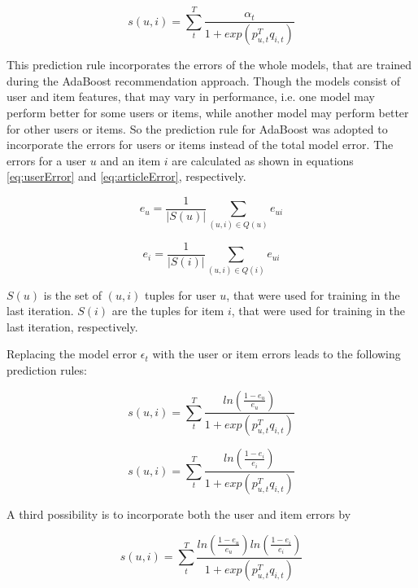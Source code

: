 \documentclass[10pt]{reportMaster}
\begin{document}
\begin{equation}
\label{eq:adaBoostPredRule}
s(u,i) = \sum_t^T{\frac{\alpha_t}{1 + exp(p_{u,t}^Tq_{i,t})}}
\end{equation}

This prediction rule incorporates the errors of the whole models, that are trained during the AdaBoost recommendation approach.
Though the models consist of user and item features, that may vary in performance, i.e. one model may perform better for some users or items, while another model may perform better for other users or items.
So the prediction rule for AdaBoost was adopted to incorporate the errors for users or items instead of the total model error.
The errors for a user $u$ and an item $i$ are calculated as shown in equations \ref{eq:userError} and \ref{eq:articleError}, respectively.

\begin{equation}
	\label{eq:userError}
	e_{u} = \frac{1}{|S(u)|} \sum_{(u,i) \in Q(u)}{e_{ui}}
\end{equation}

\begin{equation}
	\label{eq:articleError}
	e_{i} = \frac{1}{|S(i)|} \sum_{(u,i) \in Q(i)}{e_{ui}}
\end{equation}

$S(u)$ is the set of $(u,i)$ tuples for user $u$, that were used for training in the last iteration.
$S(i)$ are the tuples for item $i$, that were used for training in the last iteration, respectively.

Replacing the model error $\epsilon_t$ with the user or item errors leads to the following prediction rules:

\begin{equation}
\label{eq:userErrorPrediction}
	s(u,i) = \sum_t^T{\frac{ln(\frac{1 - e_u}{e_u})}{1 + exp(p_{u,t}^Tq_{i,t})}}
\end{equation}

\begin{equation}
\label{eq:articleErrorPrediction}
s(u,i) = \sum_t^T{\frac{ln(\frac{1 - e_i}{e_i})}{1 + exp(p_{u,t}^Tq_{i,t})}}
\end{equation}

A third possibility is to incorporate both the user and item errors by 

\begin{equation}
\label{eq:combinedErrorPrediction}
s(u,i) = \sum_t^T{\frac{ln(\frac{1 - e_u}{e_u})ln(\frac{1 - e_i}{e_i})}{1 + exp(p_{u,t}^Tq_{i,t})}}
\end{equation}
\end{document}
